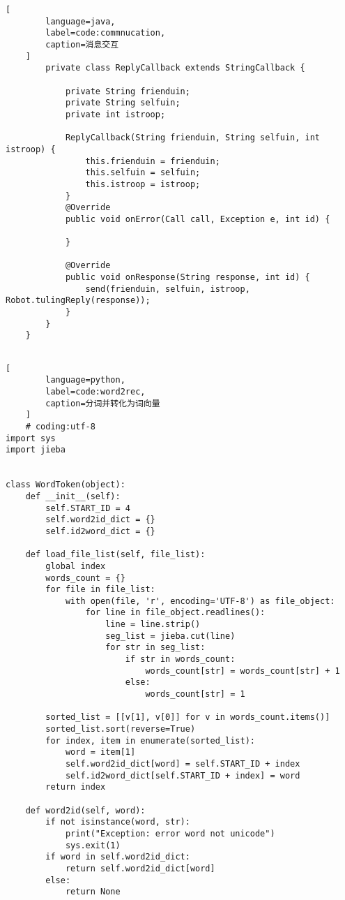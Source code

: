 \begin{appendices}
\begin{lstlisting}[
        language=java,
        label=code:commnucation,
        caption=消息交互
    ]
        private class ReplyCallback extends StringCallback {
    
            private String frienduin;
            private String selfuin;
            private int istroop;
    
            ReplyCallback(String frienduin, String selfuin, int istroop) {
                this.frienduin = frienduin;
                this.selfuin = selfuin;
                this.istroop = istroop;
            }
            @Override
            public void onError(Call call, Exception e, int id) {
    
            }
    
            @Override
            public void onResponse(String response, int id) {
                send(frienduin, selfuin, istroop, Robot.tulingReply(response));
            }
        }
    }
    
    \end{lstlisting}
    \begin{lstlisting}[
        language=python,
        label=code:word2rec,
        caption=分词并转化为词向量
    ]
    # coding:utf-8
import sys
import jieba


class WordToken(object):
    def __init__(self):
        self.START_ID = 4
        self.word2id_dict = {}
        self.id2word_dict = {}

    def load_file_list(self, file_list):
        global index
        words_count = {}
        for file in file_list:
            with open(file, 'r', encoding='UTF-8') as file_object:
                for line in file_object.readlines():
                    line = line.strip()
                    seg_list = jieba.cut(line)
                    for str in seg_list:
                        if str in words_count:
                            words_count[str] = words_count[str] + 1
                        else:
                            words_count[str] = 1

        sorted_list = [[v[1], v[0]] for v in words_count.items()]
        sorted_list.sort(reverse=True)
        for index, item in enumerate(sorted_list):
            word = item[1]
            self.word2id_dict[word] = self.START_ID + index
            self.id2word_dict[self.START_ID + index] = word
        return index

    def word2id(self, word):
        if not isinstance(word, str):
            print("Exception: error word not unicode")
            sys.exit(1)
        if word in self.word2id_dict:
            return self.word2id_dict[word]
        else:
            return None


\end{lstlisting}
\end{appendices}

